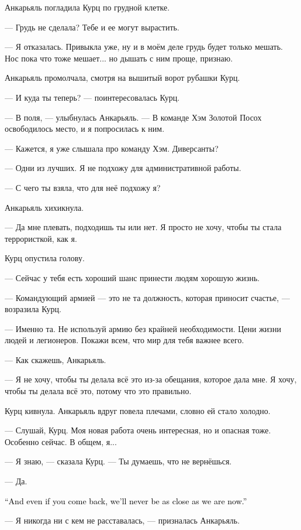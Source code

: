 \documentclass[a4paper,10pt,fleqn]{book}\usepackage{polyglossia}\setdefaultlanguage{english}\setotherlanguage{russian}\defaultfontfeatures{Ligatures=TeX,Mapping=tex-text}\usepackage{xcolor}\definecolor{lightgray}{HTML}{bbbbbb}\color{lightgray}\newcommand{\ml}[3]{\textcolor{black}{#3}}
\begin{document}
Анкарьяль погладила Курц по грудной клетке.

--- Грудь не сделала?
Тебе и ее могут вырастить.

--- Я отказалась.
Привыкла уже, ну и в моём деле грудь будет только мешать.
Нос пока что тоже мешает... но дышать с ним проще, признаю.

Анкарьяль промолчала, смотря на вышитый ворот рубашки Курц.

--- И куда ты теперь? --- поинтересовалась Курц.

--- В поля, --- улыбнулась Анкарьяль.
--- В команде Хэм Золотой Посох освободилось место, и я попросилась к ним.

--- Кажется, я уже слышала про команду Хэм.
Диверсанты?

--- Одни из лучших.
Я не подхожу для административной работы.

--- С чего ты взяла, что для неё подхожу я?

Анкарьяль хихикнула.

--- Да мне плевать, подходишь ты или нет.
Я просто не хочу, чтобы ты стала террористкой, как я.

Курц опустила голову.

--- Сейчас у тебя есть хороший шанс принести людям хорошую жизнь.

--- Командующий армией --- это не та должность, которая приносит счастье, --- возразила Курц.

--- Именно та.
Не используй армию без крайней необходимости.
Цени жизни людей и легионеров.
Покажи всем, что мир для тебя важнее всего.

--- Как скажешь, Анкарьяль.

--- Я не хочу, чтобы ты делала всё это из-за обещания, которое дала мне.
Я хочу, чтобы ты делала всё это, потому что это правильно.

Курц кивнула.
Анкарьяль вдруг повела плечами, словно ей стало холодно.

--- Слушай, Курц.
Моя новая работа очень интересная, но и опасная тоже.
Особенно сейчас.
В общем, я...

--- Я знаю, --- сказала Курц.
--- Ты думаешь, что не вернёшься.

--- Да.

\ml{$0$}
{--- А если вернёшься, мы никогда не будем так близки.}
{``And even if you come back, we'll never be as close as we are now.''}

--- Я никогда ни с кем не расставалась, --- призналась Анкарьяль.
\end{document}
